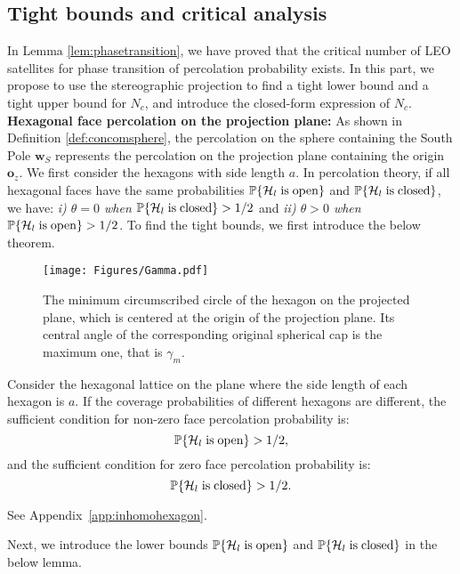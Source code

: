 \documentclass[final]{IEEEtran}
\begin{document}
\subsection{Tight bounds and critical analysis}
 In Lemma \ref{lem:phasetransition}, we have proved that the critical number of LEO satellites for phase transition of percolation probability exists. In this part, we propose to use the stereographic projection to find a tight lower bound and a tight upper bound for $N_c$, and introduce the closed-form expression of $N_c$.\\
 
 \noindent\textbf{Hexagonal face percolation on the projection plane:} As shown in Definition \ref{def:concomsphere}, the percolation on the sphere containing the South Pole $\textbf{w}_S$ represents the percolation on the projection plane containing the origin $\textbf{o}_z$. We first consider the hexagons with side length $a$. In percolation theory, if all hexagonal faces have the same probabilities $\P\{\mathcal{H}_{l} {\rm \; is\;open}\}$ and $\P\{\mathcal{H}_{l} {\rm \; is\;closed}\}$, we have: \textit{i) $\theta=0$ when $\P\{\mathcal{H}_{l} {\rm \; is\;closed}\}>1/2$ }and\textit{ ii) $\theta>0$ when $\P\{\mathcal{H}_{l} {\rm \; is\;open}\}>1/2$}. To find the tight bounds, we first introduce the below theorem.

 \begin{figure}
    \centering
    \texttt{[image: Figures/Gamma.pdf]}
    \caption{The minimum circumscribed circle of the hexagon on the projected plane, which is centered at the origin of the projection plane. Its central angle of the corresponding original spherical cap is the maximum one, that is $\gamma_m$. }
    \label{fig:gamma}
\end{figure}

\begin{theorem}
    Consider the hexagonal lattice on the plane where the side length of each hexagon is $a$. If the coverage probabilities of different hexagons are different,
    the sufficient condition for non-zero face percolation probability is:
\begin{equation}
    \P\{\mathcal{H}_{l} {\rm \; is\;open}\}>1/2,
\label{sufficientcover}
\end{equation}
and the sufficient condition for zero face percolation probability is:
\begin{equation}
    \P\{\mathcal{H}_{l} {\rm \; is\;closed}\}>1/2.
\label{sufficientnotcover}
\end{equation}
\label{theo:inhomohexagon}
\end{theorem}
\begin{IEEEproof}
    See Appendix~\ref{app:inhomohexagon}.
\end{IEEEproof}
\indent Next, we introduce the lower bounds $\P\{\mathcal{H}_{l} {\rm \; is\;open}\}$ and $\P\{\mathcal{H}_{l} {\rm \; is\;closed}\}$ in the below lemma.
\end{document}
